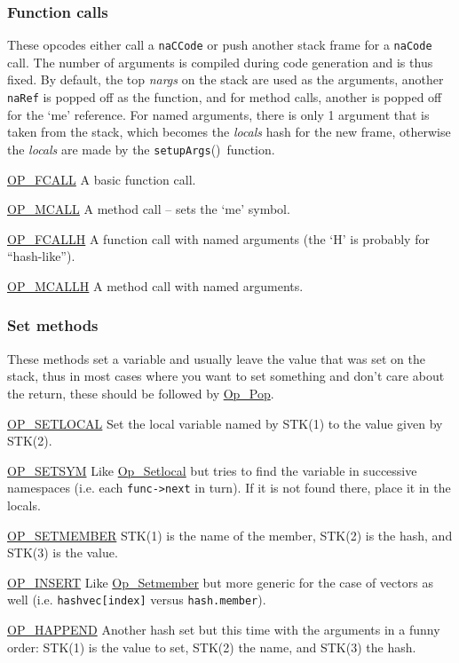 \documentclass{article}
\newcommand{\name}[1]{{\it #1}}
\newcommand{\type}[1]{\textcolor{type}{\tt #1}}
\newcommand{\func}[1]{\textcolor{func}{\tt #1}}
\newcommand{\OP} [1]{\hyperref[op:#1]{\textcolor{opcode}{OP\_#1}}}
\newcommand{\Op} [1]{\hyperref[op:#1]{\textcolor{opcode}{\sc Op\_#1}}}
\newcommand{\fp}{\textcolor{func}{()}}
\begin{document}
\subsubsection{Function calls}
These opcodes either call a \type{naCCode} or push another stack frame for a \type{naCode} call.  The number of arguments is compiled during code generation and is thus fixed.  By default, the top \name{nargs} on the stack are used as the arguments, another \type{naRef} is popped off as the function, and for method calls, another is popped off for the `me' reference.  For named arguments, there is only 1 argument that is taken from the stack, which becomes the \name{locals} hash for the new frame, otherwise the \name{locals} are made by the \func{setupArgs}\fp\ function.
\begin{description}
    \item \OP{FCALL} \label{op:FCALL}\label{op:Fcall} A basic function call.
    \item \OP{MCALL} \label{op:MCALL}\label{op:Mcall} A method call -- sets the `me' symbol.
    \item \OP{FCALLH}\label{op:FCALLH}\label{op:Fcallh} A function call with named arguments (the `H' is probably for ``hash-like'').
    \item \OP{MCALLH}\label{op:MCALLH}\label{op:Mcallh} A method call with named arguments.
\end{description}

\subsubsection{Set methods}
These methods set a variable and usually leave the value that was set on the stack, thus in most cases where you want to set something and don't care about the return, these should be followed by \Op{Pop}.
\begin{description}
    \item \OP{SETLOCAL} \label{op:SETLOCAL}\label{op:Setlocal} Set the local variable named by STK(1) to the value given by STK(2).
    \item \OP{SETSYM}   \label{op:SETSYM}\label{op:Setsym} Like \Op{Setlocal} but tries to find the variable in successive namespaces (i.e. each \verb$func->next$ in turn).  If it is not found there, place it in the locals.
    \item \OP{SETMEMBER}\label{op:SETMEMBER}\label{op:Setmember} STK(1) is the name of the member, STK(2) is the hash, and STK(3) is the value.
    \item \OP{INSERT}   \label{op:INSERT}\label{op:Insert} Like \Op{Setmember} but more generic for the case of vectors as well (i.e. \verb$hashvec[index]$ versus \verb$hash.member$).
    \item \OP{HAPPEND}  \label{op:HAPPEND}\label{op:Happend} Another hash set but this time with the arguments in a funny order: STK(1) is the value to set, STK(2) the name, and STK(3) the hash.
\end{description}
\end{document}
